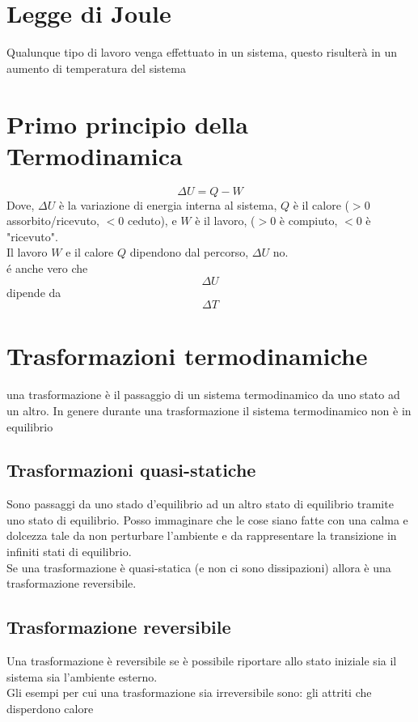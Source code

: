 \documentclass[a4paper]{report}
\begin{document}
  \section{Legge di Joule}
  Qualunque tipo di lavoro venga effettuato in un sistema, questo risulterà in un aumento di temperatura del sistema


  \section{Primo principio della Termodinamica}
  $$ \Delta U = Q - W $$
  Dove, $\Delta U$ è la variazione di energia interna al sistema, $Q$ è il calore ($>0$ assorbito/ricevuto, $<0$ ceduto), e $W$ è il lavoro, ($>0$ è compiuto, $<0$ è "ricevuto".\\
  Il lavoro $W$ e il calore $Q$ dipendono dal percorso, $\Delta U$ no.\\
  é anche vero che
  $$\Delta U$$ dipende da $$\Delta T$$

  \section{Trasformazioni termodinamiche}
  una trasformazione è il passaggio di un sistema termodinamico da uno stato ad un altro. In genere durante una trasformazione il sistema termodinamico non è in equilibrio

  \subsection{Trasformazioni quasi-statiche}
  Sono passaggi da uno stado d'equilibrio ad un altro stato di equilibrio tramite uno stato di equilibrio. Posso immaginare che le cose siano fatte con una calma e dolcezza tale da non perturbare l'ambiente e da rappresentare la transizione in infiniti stati di equilibrio.\\
  Se una trasformazione è quasi-statica (e non ci sono dissipazioni) allora è una trasformazione reversibile.

  \subsection{Trasformazione reversibile}
  Una trasformazione è reversibile se è possibile riportare allo stato iniziale sia il sistema sia l'ambiente esterno.\\
  Gli esempi per cui una trasformazione sia irreversibile sono: gli attriti che disperdono calore
\end{document}
